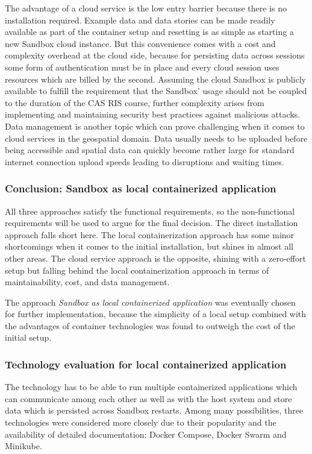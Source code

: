 \documentclass[11pt, a4paper, oneside, parskip=full-]{scrartcl}
\begin{document}
The advantage of a cloud service is the low entry barrier because there is no
installation required. Example data and data stories can be made readily
available as part of the container setup and resetting is as simple as starting
a new Sandbox cloud instance. But this convenience comes with a cost and
complexity overhead at the cloud side, because for persisting data across
sessions some form of authentication must be in place and every cloud session
uses resources which are billed by the second. Assuming the cloud Sandbox is
publicly available to fulfill the requirement that the Sandbox' usage should not
be coupled to the duration of the CAS RIS course, further complexity arises from
implementing and maintaining security best practices against malicious attacks.
Data management is another topic which can prove challenging when it comes to
cloud services in the geospatial domain. Data usually needs to be uploaded
before being accessible and spatial data can quickly become rather large for
standard internet connection upload speeds leading to disruptions and waiting
times.

\subsubsection*{Conclusion: Sandbox as local containerized application}
All three approaches satisfy the functional requirements, so the non-functional
requirements will be used to argue for the final decision. The direct
installation approach falls short here. The local containerization approach has
some minor shortcomings when it comes to the initial installation, but shines in
almost all other areas. The cloud service approach is the opposite, shining with
a zero-effort setup but falling behind the local containerization approach in
terms of maintainability, cost, and data management.

The approach \emph{Sandbox as local containerized application} was eventually
chosen for further implementation, because the simplicity of a local setup
combined with the advantages of container technologies was found to outweigh the
cost of the initial setup.

\subsubsection{Technology evaluation for local containerized application}
The technology has to be able to run multiple containerized applications which
can communicate among each other as well as with the host system and store data
which is persisted across Sandbox restarts. Among many possibilities, three
technologies were considered more closely due to their popularity and the
availability of detailed documentation: Docker Compose, Docker Swarm and
Minikube.
\end{document}
